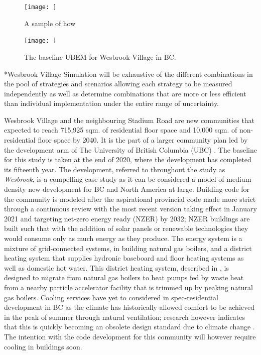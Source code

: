 \documentclass[twocolumn, a4paper,10pt]{article}
\makeatletter
\renewcommand\subsection{\@startsection{subsection}{1}{\z@}{\z@}{\z@}{\normalfont\normalsize\bfseries}}
\renewcommand\subsection{\@startsection{subsection}{1}{\z@}{\z@}{0.1pt}{\normalfont\normalsize\bfseries}}
\makeatother
\begin{document}
\begin{figure}
    \centering
    \texttt{[image: ]}
    \caption{A sample of how }
    \label{fig:sample_sequence}
\end{figure}

\begin{figure}
    \centering
    \texttt{[image: ]}
    \caption{The baseline UBEM for Wesbrook Village in BC.}
    \label{fig:wesbrook_base}
\end{figure}

\subsection*{Wesbrook Village} 
Simulation will be exhaustive of the different combinations in the pool of strategies and scenarios allowing each strategy to be measured independently as well as determine combinations that are more or less efficient than individual implementation under the entire range of uncertainty.

Wesbrook Village and the neighbouring Stadium Road are new communities that expected to reach 715,925 sqm. of residential floor space and 10,000 sqm. of non-residential floor space by 2040. It is the part of a larger community plan led by the development arm of The University of British Columbia (UBC) \citep{wesbrook plan; stadium plan}. The baseline for this study is taken at the end of 2020, where the development has completed its fifteenth year. The development, referred to throughout the study as \textit{Wesbrook}, is a compelling case study as it can be considered a model of medium-density new development for BC and North America at large. Building code for the community is modeled after the aspirational provincial code made more strict through a continuous review with the most recent version taking effect in January 2021 and targeting net-zero energy ready (NZER) by 2032; NZER buildings are built such that with the addition of solar panels or renewable technologies they would consume only as much energy as they produce. The energy system is a mixture of grid-connected systems, in building natural gas boilers, and a district heating system that supplies hydronic baseboard and floor heating systems as well as domestic hot water. This district heating system, described in \citet{McCarty 2021}, is designed to migrate from natural gas boilers to heat pumps fed by waste heat from a nearby particle accelerator facility that is trimmed up by peaking natural gas boilers. Cooling services have yet to considered in spec-residential development in BC as the climate has historically allowed comfort to be achieved in the peak of summer through natural ventilation; research however indicates that this is quickly becoming an obsolete design standard due to climate change \citep{ML cooling paper}. The intention with the code development for this community will however require cooling in buildings soon.  
\end{document}

